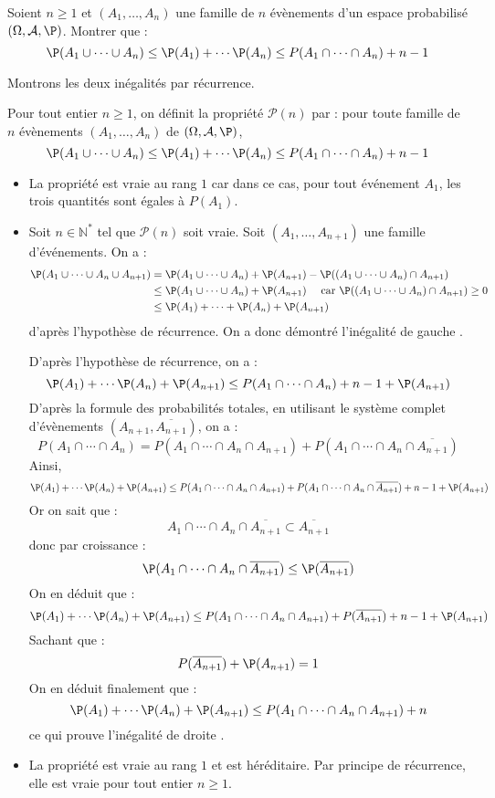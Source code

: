 \documentclass[a4paper,10pt]{report}
\begin{document}
\begin{Exa} Soient $n \geq 1$ et $(A_1, \ldots, A_n)$ une famille de $n$ évènements d'un espace probabilisé $(\Omega, \mathcal{A}, \P)$. Montrer que :
$$ \P(A_1 \cup \cdots \cup A_n) \leq \P(A_1) + \cdots \P(A_n) \leq P(A_1 \cap \cdots \cap A_n) + n-1$$
\end{Exa}

\corr Montrons les deux inégalités par récurrence.

\medskip

\noindent Pour tout entier $n \geq 1$, on définit la propriété $\mathcal{P}(n)$ par : pour toute famille de $n$ évènements $(A_1, \ldots, A_n)$ de $(\Omega, \mathcal{A}, \P)$, 
$$ \P(A_1 \cup \cdots \cup A_n) \leq \P(A_1) + \cdots \P(A_n) \leq P(A_1 \cap \cdots \cap A_n) + n-1$$

\begin{itemize}
\item La propriété est vraie au rang $1$ car dans ce cas, pour tout événement $A_1$, les trois quantités sont égales à $P(A_1)$.
\item Soit $n \in \mathbb{N}^*$ tel que $\mathcal{P}(n)$ soit vraie. Soit $(A_1, \ldots, A_{n+1})$ une famille d'événements. On a :
\begin{align*}
\P(A_1 \cup \cdots \cup A_n \cup A_{n+1}) & = \P(A_1 \cup \cdots  \cup A_{n}) + \P(A_{n+1}) - \P((A_1 \cup \cdots \cup A_n) \cap A_{n+1}) \\
& \leq \P(A_1 \cup \cdots  \cup A_{n}) + \P(A_{n+1}) \quad \hbox{ car } \P((A_1 \cup \cdots \cup A_n) \cap A_{n+1}) \geq 0 \\
& \leq \P(A_1) + \cdots + \P(A_n) + \P(A_{n+1})
\end{align*}
d'après l'hypothèse de récurrence. On a donc démontré l'inégalité \og de gauche \fg.

\medskip

\noindent D'après l'hypothèse de récurrence, on a :
$$  \P(A_1) + \cdots \P(A_n) + \P(A_{n+1}) \leq P(A_1 \cap \cdots \cap A_n) + n-1  + \P(A_{n+1})$$
D'après la formule des probabilités totales, en utilisant le système complet d'évènements $(A_{n+1}, \overline{A_{n+1}})$, on a :
$$ P(A_1 \cap \cdots \cap A_n) = P(A_1 \cap \cdots \cap A_n \cap A_{n+1}) + P(A_1 \cap \cdots \cap A_n \cap \overline{A_{n+1}})$$
Ainsi,
$$ \P(A_1) + \cdots \P(A_n) + \P(A_{n+1}) \leq P(A_1 \cap \cdots \cap A_n \cap A_{n+1}) + P(A_1 \cap \cdots \cap A_n \cap \overline{A_{n+1}}) + n-1  + \P(A_{n+1})$$
Or on sait que :
$$ A_1 \cap \cdots \cap A_n \cap \overline{A_{n+1}} \subset \overline{A_{n+1}}$$
donc par croissance :
$$ \P(A_1 \cap \cdots \cap A_n \cap \overline{A_{n+1}}) \leq \P(\overline{A_{n+1}})$$
On en déduit que : 
$$ \P(A_1) + \cdots \P(A_n) + \P(A_{n+1}) \leq P(A_1 \cap \cdots \cap A_n \cap A_{n+1}) + P(\overline{A_{n+1}}) + n-1  + \P(A_{n+1})$$
Sachant que :
$$ P(\overline{A_{n+1}}) + \P(A_{n+1})=1$$
On en déduit finalement que :
$$  \P(A_1) + \cdots \P(A_n) + \P(A_{n+1}) \leq P(A_1 \cap \cdots \cap A_n \cap A_{n+1}) +n $$
ce qui prouve l'inégalité \og de droite \fg.
\item La propriété est vraie au rang $1$ et est héréditaire. Par principe de récurrence, elle est vraie pour tout entier $n \geq 1$.
\end{itemize}
\end{document}
